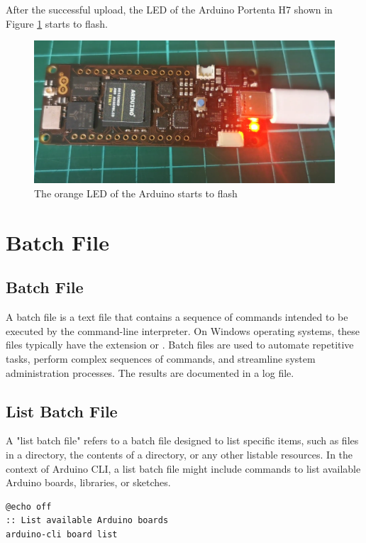 After the successful upload, the LED of the Arduino Portenta H7 shown in Figure \ref{LEDflash} starts to flash.
\begin{figure}
	\begin{center}
		\includegraphics[width=0.7\linewidth]{Images/ArduinoCLI/Blink.png}
		\caption{The orange LED of the Arduino starts to flash}
		\label{LEDflash}
	\end{center}
\end{figure}

\chapter{Batch File}

\section{Batch File}

A batch file is a text file that contains a sequence of commands intended to be executed by the command-line interpreter. On Windows operating systems, these files typically have the extension  or . Batch files are used to automate repetitive tasks, perform complex sequences of commands, and streamline system administration processes. The results are documented in a log file.  \cite{microsoftWindowsCommands:2025}

\section{List Batch File}
A "list batch file" refers to a batch file designed to list specific items, such as files in a directory, the contents of a directory, or any other listable resources. In the context of Arduino CLI, a list batch file might include commands to list available Arduino boards, libraries, or sketches.

\begin{center}
	\begin{lstlisting}
@echo off
:: List available Arduino boards
arduino-cli board list
	\end{lstlisting}
\end{center}

